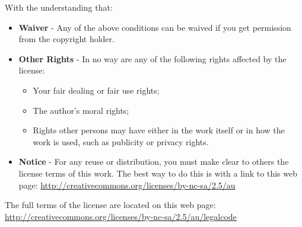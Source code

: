 \begin{flushleft}
With the understanding that:
\begin{itemize}
	\item \textbf{Waiver} - Any of the above conditions can be waived if you get permission from the copyright holder.
	\item \textbf{Other Rights} - In no way are any of the following rights affected by the license:
	\begin{itemize}
		\item Your fair dealing or fair use rights;
		\item The author's moral rights;
		\item Rights other persons may have either in the work itself or in how the work is used, such as publicity or privacy rights.
	\end{itemize}
	\item \textbf{Notice} - For any reuse or distribution, you must make clear to others the license terms of this work. The best way to do this is with a link to this web page: \url{http://creativecommons.org/licenses/by-nc-sa/2.5/au}
\end{itemize}

The full terms of the license are located on this web page: \url{http://creativecommons.org/licenses/by-nc-sa/2.5/au/legalcode}

\end{flushleft}
